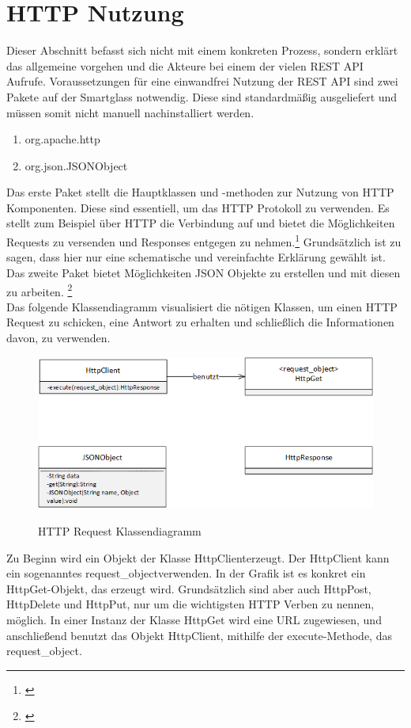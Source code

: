 \section{HTTP Nutzung}
\label{sec:httpnutzung}
Dieser Abschnitt befasst sich nicht mit einem konkreten Prozess, sondern erklärt das allgemeine vorgehen und die Akteure bei einem der vielen REST API Aufrufe. Voraussetzungen für eine einwandfrei Nutzung der REST API sind zwei Pakete auf der Smartglass notwendig. Diese sind standardmäßig ausgeliefert und müssen somit nicht manuell nachinstalliert werden.
\begin{enumerate}
	\item org.apache.http
	\item org.json.JSONObject
\end{enumerate}
Das erste Paket stellt die Hauptklassen und -methoden zur Nutzung von HTTP Komponenten. Diese sind essentiell, um das HTTP Protokoll zu verwenden. Es stellt zum Beispiel über HTTP die Verbindung auf und bietet die Möglichkeiten Requests zu versenden und Responses entgegen zu nehmen.\footnote{\citep{http}} Grundsätzlich ist zu sagen, dass hier nur eine schematische und vereinfachte Erklärung gewählt ist. 
\\
Das zweite Paket bietet Möglichkeiten JSON Objekte zu erstellen und mit diesen zu arbeiten. \footnote{\citep{json}}
\\
Das folgende Klassendiagramm visualisiert die nötigen Klassen, um einen HTTP Request zu schicken, eine Antwort zu erhalten und schließlich die Informationen davon, zu verwenden.
\begin{figure}[H]
	\centering
	{\includegraphics[scale=0.7]{Bilder/Abbildungen/http_request_klassendiagramm.png}}
	\caption{HTTP Request Klassendiagramm}
	\label{fig:sequenz_warenannnahme}
\end{figure}
Zu Beginn wird ein Objekt der Klasse \glqq HttpClient\grqq erzeugt. Der HttpClient kann ein sogenanntes \glqq request\_object\grqq verwenden. In der Grafik ist es konkret ein \glqq HttpGet\grqq -Objekt, das erzeugt wird. Grundsätzlich sind aber auch HttpPost, HttpDelete und HttpPut, nur um die wichtigsten HTTP Verben zu nennen, möglich. In einer Instanz der Klasse HttpGet wird eine URL zugewiesen, und anschließend benutzt das Objekt HttpClient, mithilfe der \glqq execute\grqq -Methode, das request\_object.
